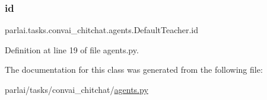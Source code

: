 \subsubsection{\texorpdfstring{id}{id}}
{\footnotesize\ttfamily parlai.\+tasks.\+convai\+\_\+chitchat.\+agents.\+Default\+Teacher.\+id}



Definition at line 19 of file agents.\+py.



The documentation for this class was generated from the following file\+:\begin{DoxyCompactItemize}
\item 
parlai/tasks/convai\+\_\+chitchat/\hyperlink{parlai_2tasks_2convai__chitchat_2agents_8py}{agents.\+py}\end{DoxyCompactItemize}
